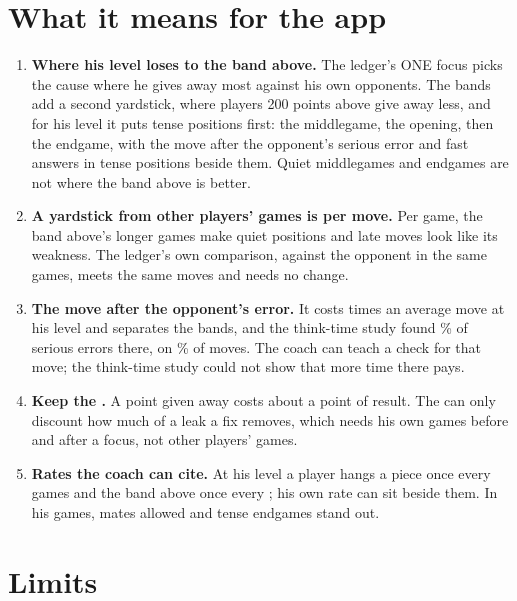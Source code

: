 \documentclass[11pt]{article}
\begin{document}
\begin{table}[h]
\centering
\scriptsize\HisKindsTable
\caption{How often a board shows an error (added after the results were read; it tests nothing):
per game in his games and in each band, with 95\% intervals.}
\label{tab:hiskinds}
\end{table}

\section{What it means for the app}

\begin{enumerate}[leftmargin=*]
\item \textbf{Where his level loses to the band above.} The ledger's ONE focus picks the cause where
he gives away most against his own opponents. The bands add a second yardstick, where players 200
points above give away less, and for his level it puts tense positions first: the middlegame, the
opening, then the endgame, with the move after the opponent's serious error and fast answers in
tense positions beside them. Quiet middlegames and endgames are not where the band above is better.
\item \textbf{A yardstick from other players' games is per move.} Per game, the band above's longer
games make quiet positions and late moves look like its weakness. The ledger's own comparison,
against the opponent in the same games, meets the same moves and needs no change.
\item \textbf{The move after the opponent's error.} It costs \GiftRatio{} times an average move at
his level and separates the bands, and the think-time study found \ThinkGiftErrors\% of serious
errors there, on \ThinkGiftMoves\% of moves.
The coach can teach a check for that move; the think-time study could not show that more time there
pays.
\item \textbf{Keep the \Discount.} A point given away costs about a point of result. The \Discount{}
can only discount how much of a leak a fix removes, which needs his own games before and after a
focus, not other players' games.
\item \textbf{Rates the coach can cite.} At his level a player hangs a piece once every
\HisHangingEvery{} games and the band above once every \AboveHangingEvery; his own rate can sit
beside them. In his games, mates allowed and tense endgames stand out.
\end{enumerate}

\section{Limits}
\end{document}
